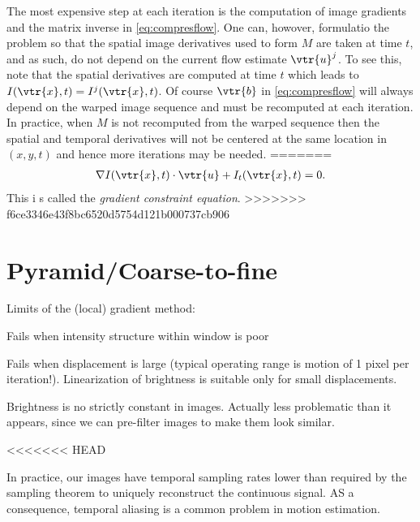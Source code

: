 \begin{compactdesc}
The most expensive step at each iteration is the computation of image gradients and the matrix inverse in \ref{eq:compresflow}. One can, howover, formulatio the problem so that the spatial image derivatives used to form $M$ are taken at time $t$, and as such, do not depend on the current flow estimate $\vtr{u}^j$. To see this, note that the spatial derivatives are computed at time $t$ which leads to $I(\vtr{x},t)=I^j(\vtr{x},t)$. Of course $\vtr{b}$ in \ref{eq:compresflow} will always depend on the warped image sequence and must be recomputed at each iteration. In practice, when $M$ is not recomputed from the warped sequence then the spatial and temporal derivatives will not be centered at the same location in $(x,y,t)$ and hence more iterations may be needed.
=======
\begin{gather*}
	\nabla I(\vtr{x},t)\cdot\vtr{u}+I_t(\vtr{x},t)=0.
\end{gather*}
This i s called the \emph{gradient constraint equation}.
>>>>>>> f6ce3346e43f8bc6520d5754d121b000737cb906
\section{Pyramid/Coarse-to-fine}
Limits of the (local) gradient method:
\begin{enumerate*}[label=\protect\circled{\arabic*},itemjoin=]
	\item Fails when intensity structure within window is poor\\
	\item Fails when displacement is large (typical operating range is motion of 1 pixel per iteration!). Linearization of brightness is suitable only for small displacements. \\
	\item Brightness is no strictly constant in images. Actually less problematic than it appears, since we can pre-filter images to make them look similar.\\
\end{enumerate*}
<<<<<<< HEAD

In practice, our images have temporal sampling rates lower than required by the sampling theorem to uniquely reconstruct the continuous signal. AS a consequence, temporal aliasing is a common problem in motion estimation.


\end{compactdesc}
